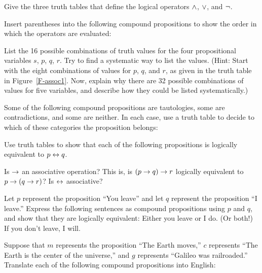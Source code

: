 \begin{exercises}

\problem Give the three truth tables that define the logical operators
$\wedge$, $\vee$, and $\lnot$.

\problem Insert parentheses into the following compound propositions to show
the order in which the operators are evaluated:

\problem List the 16 possible combinations of truth values for
the four propositional variables $s$, $p$, $q$, $r$.  Try to find
a systematic way to list the values.  (Hint:  Start with the
eight combinations of values for $p$, $q$, and $r$, as given in
the truth table in Figure~\ref{F-assoc1}.  Now, explain why there
are 32 possible combinations of values for five variables, and
describe how they could be listed systematically.)

\problem Some of the following compound propositions are tautologies,
some are contradictions, and some are neither.  In each case, use a
truth table to decide to which of these categories the proposition
belongs:

\problem Use truth tables to show that each of the following
propositions is logically equivalent to $p\leftrightarrow q$.

\problem Is $\rightarrow$ an associative operation?  This is,
is $(p\rightarrow q)\rightarrow r$ logically equivalent to
$p\rightarrow(q\rightarrow r)$?  Is $\leftrightarrow$ associative?

\problem Let $p$ represent the proposition ``You leave'' and let
$q$ represent the proposition ``I leave.''  Express the following
sentences as compound propositions using $p$ and $q$, and show
that they are logically equivalent:
\ppart Either you leave or I do. (Or both!)
\ppart If you don't leave, I will.

\problem Suppose that $m$ represents the proposition ``The Earth moves,''
$c$ represents ``The Earth is the center of the universe,'' and
$g$ represents ``Galileo was railroaded.''  Translate each of the
following compound propositions into English:
   

\end{exercises}
